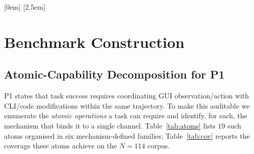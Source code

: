\newpage
\appendix
\setcounter{table}{0}
\setcounter{figure}{0}
\setcounter{section}{0}
\renewcommand{\thetable}{\Alph{section}\arabic{table}}
\renewcommand{\thefigure}{\Alph{section}\arabic{figure}}
\renewcommand{\thesection}{\Alph{section}}

\let\oldappendixsection\section
\renewcommand{\section}[1]{%
  \oldappendixsection{#1}%
  \setcounter{table}{0}%
  \setcounter{figure}{0}%
}

\ifappendixtoc
  \startcontents[appendix]
  \vspace{1.5em}
  [0em]{\large\bfseries\color{msftblue}\vspace{0.8em}}{\thecontentslabel\hspace{0.5em}}{}{\contentspage}
  [2.5em]{\normalsize\color{msftblue}\vspace{0.3em}}{\thecontentslabel\hspace{0.5em}}{}{\contentspage}
  \newpage
\fi

\section{Benchmark Construction}
\label{app:overall_benchmark}

\subsection{Atomic-Capability Decomposition for P1}
\label{app:p1-falsifier}

P1 states that task success requires coordinating GUI observation/action with CLI/code modifications within the same trajectory. To make this auditable we enumerate the \emph{atomic operations} a task can require and identify, for each, the mechanism that binds it to a single channel. Table~\ref{tab:atoms} lists $19$ such atoms organised in six mechanism-defined families; Table~\ref{tab:cov} reports the coverage these atoms achieve on the $N{=}114$ corpus.

